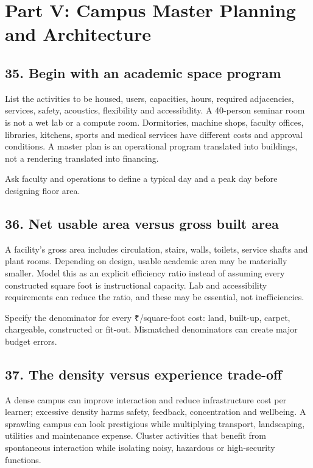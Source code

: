\section*{Part V: Campus Master Planning and Architecture}


\subsection{35. Begin with an academic space program}

List the activities to be housed, users, capacities, hours, required adjacencies, services, safety, acoustics, flexibility and accessibility. A 40-person seminar room is not a wet lab or a compute room. Dormitories, machine shops, faculty offices, libraries, kitchens, sports and medical services have different costs and approval conditions. A master plan is an operational program translated into buildings, not a rendering translated into financing.

Ask faculty and operations to define a typical day and a peak day before designing floor area.


\subsection{36. Net usable area versus gross built area}

A facility's gross area includes circulation, stairs, walls, toilets, service shafts and plant rooms. Depending on design, usable academic area may be materially smaller. Model this as an explicit efficiency ratio instead of assuming every constructed square foot is instructional capacity. Lab and accessibility requirements can reduce the ratio, and these may be essential, not inefficiencies.

Specify the denominator for every \textnormal{₹}/square-foot cost: land, built-up, carpet, chargeable, constructed or fit-out. Mismatched denominators can create major budget errors.


\subsection{37. The density versus experience trade-off}

A dense campus can improve interaction and reduce infrastructure cost per learner; excessive density harms safety, feedback, concentration and wellbeing. A sprawling campus can look prestigious while multiplying transport, landscaping, utilities and maintenance expense. Cluster activities that benefit from spontaneous interaction while isolating noisy, hazardous or high-security functions.

